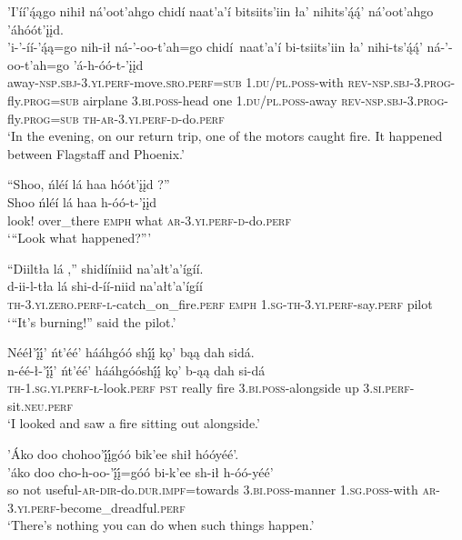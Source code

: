 \ea\label{ex:text9-9-8}
’I’íí’ą́ągo nihił ná’oot’ahgo chidí naat’a’í bitsiits’iin ła’ nihits’ą́ą́’ ná’oot’ahgo ’áhóót’įįd.\\
\gll ’i-’-íí-’ą́ą=go	nih-ił	ná-’-oo-t’ah=go	chidí~{naat’a’í}	bi-tsiits’iin	ła’	nihi-ts’ą́ą́’	ná-’-oo-t’ah=go	’á-h-óó-t-’įįd\\
     away-\textsc{nsp}.\textsc{sbj}-3.\textsc{yi}.\textsc{perf}-move.\textsc{sro}.\textsc{perf}=\textsc{sub}	1.\textsc{du}/\textsc{pl}.\textsc{poss}-with	\textsc{rev}-\textsc{nsp}.\textsc{sbj}-3.\textsc{prog}-fly.\textsc{prog}=\textsc{sub}	airplane	3.\textsc{bi}.\textsc{poss}-head	one	1.\textsc{du}/\textsc{pl}.\textsc{poss}-away	\textsc{rev}-\textsc{nsp}.\textsc{sbj}-3.\textsc{prog}-fly.\textsc{prog}=\textsc{sub}	\textsc{th}-\textsc{ar}-3.\textsc{yi}.\textsc{perf}-\textsc{d}-do.\textsc{perf}\\
\glt `In the evening, on our return trip, one of the motors caught fire. It happened between Flagstaff and Phoenix.'
\z

\ea\label{ex:text9-9-9}
``Shoo, ńléí lá haa hóót’įįd ?''\\
\gll Shoo	ńléí	lá	haa	h-óó-t-’įįd\\
     look!	over\_there	\textsc{emph}	what	\textsc{ar}-3.\textsc{yi}.\textsc{perf}-\textsc{d}-do.\textsc{perf}\\
\glt `“Look what happened?'''
\z

\ea\label{ex:text9-9-10}
``Diiltła lá ,'' shidííniid na’ałt’a’ígíí.\\
\gll d-ii-l-tła	lá	shi-d-íí-niid	na’ałt’a’ígíí\\
     \textsc{th}-3.\textsc{yi}.\textsc{zero}.\textsc{perf}-\textsc{l}-catch\_on\_fire.\textsc{perf}	\textsc{emph}	1.\textsc{sg}-\textsc{th}-3.\textsc{yi}.\textsc{perf}-say.\textsc{perf}	pilot\\
\glt `“It's burning!'' said the pilot.'
\z

\ea\label{ex:text9-9-11}
Nééł’į́į́’ ńt’éé’ hááhgóó shį́į́ kǫ’ bąą dah sidá.\\
\gll n-éé-ł-’į́į́’	ńt’éé’	hááhgóóshį́į́	kǫ’	b-ąą	dah	si-dá\\
     \textsc{th}-1.\textsc{sg}.\textsc{yi}.\textsc{perf}-\textsc{ł}-look.\textsc{perf}	\textsc{pst}	really	fire	3.\textsc{bi}.\textsc{poss}-alongside	up	3.\textsc{si}.\textsc{perf}-sit.\textsc{neu}.\textsc{perf}\\
\glt `I looked and saw a fire sitting out alongside.'
\z

\ea\label{ex:text9-9-12}
’Áko doo chohoo’į́į́góó bik’ee shił hóóyéé’.\\
\gll ’áko	doo	cho-h-oo-’į́į́=góó	bi-k’ee	sh-ił	h-óó-yéé’\\
     so	not	useful-\textsc{ar}-\textsc{dir}-do.\textsc{dur}.\textsc{impf}=towards	3.\textsc{bi}.\textsc{poss}-manner	1.\textsc{sg}.\textsc{poss}-with	\textsc{ar}-3.\textsc{yi}.\textsc{perf}-become\_dreadful.\textsc{perf}\\
\glt `There's nothing you can do when such things happen.'
\z

